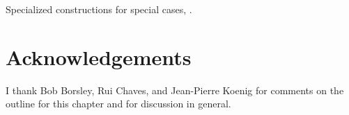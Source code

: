 \documentclass[output=paper]{langsci/langscibook}
\begin{document}
Specialized constructions for special cases, \eg {}.

\section*{Acknowledgements}

I thank Bob Borsley, Rui Chaves, and Jean-Pierre Koenig for comments on the outline for this chapter and for discussion in general.

\printbibliography[heading=subbibliography,notkeyword=this] 
\end{document}
